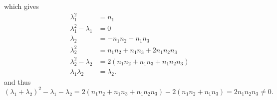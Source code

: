 \documentclass[aps,preprint]{revtex4}%
\begin{document}
which gives%
\begin{align}
\lambda_{1}^{2}  &  =n_{1}\nonumber\\
\lambda_{1}^{2}-\lambda_{1}  &  =0\nonumber\\
\lambda_{2}  &  =-n_{1}n_{2}-n_{1}n_{3}\nonumber\\
\lambda_{2}^{2}  &  =n_{1}n_{2}+n_{1}n_{3}+2n_{1}n_{2}n_{3}\nonumber\\
\lambda_{2}^{2}-\lambda_{2}  &  =2\left(  n_{1}n_{2}+n_{1}n_{3}+n_{1}%
n_{2}n_{3}\right) \nonumber\\
\lambda_{1}\lambda_{2}  &  =\lambda_{2}.
\end{align}
and thus%
\begin{equation}
\left(  \lambda_{1}+\lambda_{2}\right)  ^{2}-\lambda_{1}-\lambda_{2}=2\left(
n_{1}n_{2}+n_{1}n_{3}+n_{1}n_{2}n_{3}\right)  -2\left(  n_{1}n_{2}+n_{1}%
n_{3}\right)  =2n_{1}n_{2}n_{3}\neq0.
\end{equation}
\end{document}
